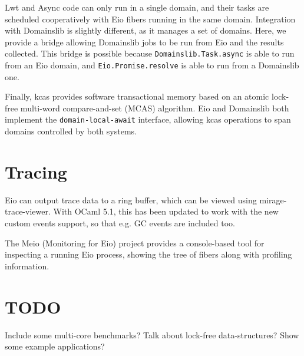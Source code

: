 \documentclass[a4paper,twocolumn]{article}
\begin{document}
Lwt and Async code can only run in a single domain,
and their tasks are scheduled cooperatively with Eio fibers running in the same domain.
Integration with Domainslib is slightly different, as it manages a set of domains.
Here, we provide a bridge allowing Domainslib jobs to be run from Eio and the results collected.
This bridge is possible because \verb|Domainslib.Task.async| is able to run from an Eio domain,
and \verb|Eio.Promise.resolve| is able to run from a Domainslib one.

Finally, kcas provides software transactional memory based on an atomic lock-free multi-word compare-and-set (MCAS) algorithm.
Eio and Domainslib both implement the \verb|domain-local-await| interface,
allowing kcas operations to span domains controlled by both systems.

\section*{Tracing}

Eio can output trace data to a ring buffer, which can be viewed using mirage-trace-viewer.
With OCaml 5.1, this has been updated to work with the new custom events support, so that e.g. GC events are included too.

The Meio (Monitoring for Eio) project provides a console-based tool for inspecting a running Eio process,
showing the tree of fibers along with profiling information.

\section*{TODO}

Include some multi-core benchmarks? Talk about lock-free data-structures? Show some example applications?
\end{document}
